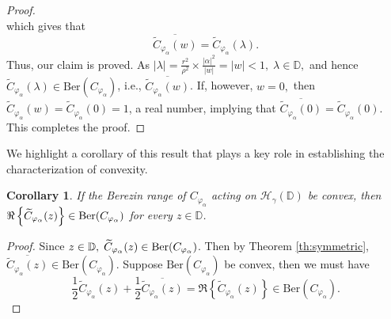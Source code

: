 \documentclass[12pt, reqno]{amsart}
\newtheorem{corollary}[theorem]{Corollary}
\theoremstyle{definition}
\theoremstyle{remark}
\numberwithin{equation}{section}
\renewcommand{\a}{\alpha}
\begin{document}
\begin{proof}
\begin{equation*}
    \end{equation*}
    which gives that 
    \begin{equation*}
        \overline{\widetilde{C}_{\varphi_\alpha}(w)}=\widetilde{C}_{\varphi_\alpha}(\lambda).
    \end{equation*}
    Thus, our claim is proved. As $|\lambda|=\frac{r^2}{\rho^2}\times\frac{|\alpha|^2}{|w|}=|w|<1,\;\lambda\in \mathbb{D},$ and hence $\widetilde{C}_{\varphi_\alpha}(\lambda)\in \mbox{Ber}(C_{\varphi_\alpha})$, i.e., $\overline{\widetilde{C}_{\varphi_\alpha}(w)}$. If, however, $w=0,$ then $\widetilde{C}_{\varphi_\alpha}(w)=\widetilde{C}_{\varphi_\a}(0)=1$, a real number, implying that $\overline{\widetilde{C}_{\varphi_\alpha}(0)}=\widetilde{C}_{\varphi_\alpha}(0)$.
    This completes the proof. 
\end{proof}
We highlight a corollary of this result that plays a key role in establishing the characterization of convexity.
\begin{corollary}\label{cor:real_in_Berezin_range}
        If the Berezin range of $C_{\varphi_\alpha}$ acting on $\mathcal{H}_\gamma(\mathbb{D})$ be convex, then $\Re\left\{\widetilde{C}_{\varphi_\alpha}(z)\right\}\in \textnormal{Ber}(C_{\varphi_\alpha})$ for every $z\in \mathbb{D}$.
    \end{corollary}
    \begin{proof}
    Since $z\in \mathbb{D},\;\widetilde{C}_{\varphi_\alpha}(z)\in \textnormal{Ber}(C_{\varphi_\alpha})$. Then by Theorem \ref{th:symmetric}, $\overline{\widetilde{C}_{\varphi_\alpha}(z)}\in \mbox{Ber}(C_{\varphi_\alpha})$. Suppose $\mbox{Ber}(C_{\varphi_\alpha})$ be convex, then we must have
    \begin{equation*}
        \frac{1}{2}\widetilde{C}_{\varphi_\alpha}(z)+\frac{1}{2}\overline{\widetilde{C}_{\varphi_\alpha}(z)}=\Re\left\{\widetilde{C}_{\varphi_\alpha}(z)\right\}\in\mbox{Ber}(C_{\varphi_\alpha}).
    \end{equation*}
     \end{proof}
    
\end{document}
